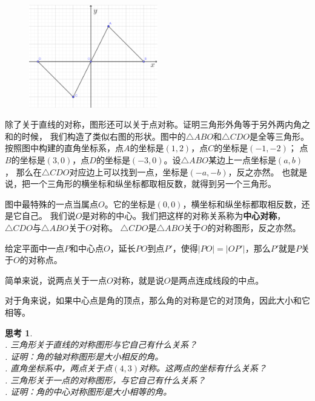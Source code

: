 \documentclass[12pt,UTF8]{ctexbook}
\newtheorem{sk}{思考}[section]
\begin{document}
\begin{figure} %
    \vspace{-15pt}
    \centering
    \includegraphics[width=0.5\textwidth]{tu/轴对称1.png}
\end{figure}

除了关于直线的对称，图形还可以关于点对称。证明三角形外角等于另外两内角之和的时候，
我们构造了类似右图的形状。图中的$\triangle ABO$和$\triangle CDO$是全等三角形。
按照图中构建的直角坐标系，点$A$的坐标是$(1,2)$，点$C$的坐标是$(-1, -2)$；
点$B$的坐标是$(3,0)$，点$D$的坐标是$(-3, 0)$。设$\triangle ABO$某边上一点坐标是$(a, b)$，
那么在$\triangle CDO$对应边上可以找到一点，坐标是$(-a, -b)$，反之亦然。
也就是说，把一个三角形的横坐标和纵坐标都取相反数，就得到另一个三角形。

图中最特殊的一点当属点$O$。它的坐标是$(0,0)$，横坐标和纵坐标都取相反数，还是它自己。
我们说$O$是对称的中心。我们把这样的对称关系称为\textbf{中心对称}，$\triangle CDO$与$\triangle ABO$关于$O$对称。
$\triangle CDO$是$\triangle ABO$关于$O$的对称图形，反之亦然。

给定平面中一点$P$和中心点$O$，延长$PO$到点$P'$，使得$|PO| = |OP'|$，那么$P'$就是$P$关于$O$的对称点。

简单来说，说两点关于一点$O$对称，就是说$O$是两点连成线段的中点。

对于角来说，如果中心点是角的顶点，那么角的对称是它的对顶角，因此大小和它相等。

\begin{sk}\label{sk:4-1-0}
    \mbox{} \\
    . 三角形关于直线的对称图形与它自己有什么关系？\\
    . 证明：角的轴对称图形是大小相反的角。\\
    . 直角坐标系中，两点关于点$(4,3)$对称。这两点的坐标有什么关系？\\
    . 三角形关于一点的对称图形，与它自己有什么关系？\\
    . 证明：角的中心对称图形是大小相等的角。
\end{sk}
\end{document}
